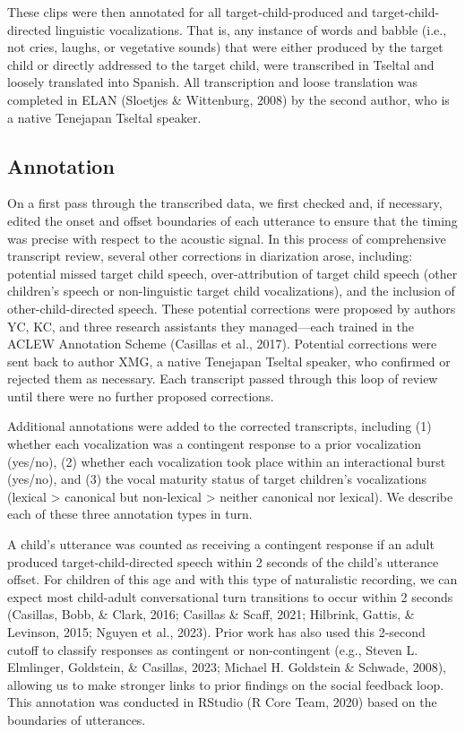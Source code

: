 \documentclass[
  man]{apa6}
\begin{document}
These clips were then annotated for all target-child-produced and target-child-directed linguistic vocalizations. That is, any instance of words and babble (i.e., not cries, laughs, or vegetative sounds) that were either produced by the target child or directly addressed to the target child, were transcribed in Tseltal and loosely translated into Spanish. All transcription and loose translation was completed in ELAN (Sloetjes \& Wittenburg, 2008) by the second author, who is a native Tenejapan Tseltal speaker.

\hypertarget{annotation}{%
\subsection{Annotation}\label{annotation}}

On a first pass through the transcribed data, we first checked and, if necessary, edited the onset and offset boundaries of each utterance to ensure that the timing was precise with respect to the acoustic signal. In this process of comprehensive transcript review, several other corrections in diarization arose, including: potential missed target child speech, over-attribution of target child speech (other children's speech or non-linguistic target child vocalizations), and the inclusion of other-child-directed speech. These potential corrections were proposed by authors YC, KC, and three research assistants they managed---each trained in the ACLEW Annotation Scheme (Casillas et al., 2017). Potential corrections were sent back to author XMG, a native Tenejapan Tseltal speaker, who confirmed or rejected them as necessary. Each transcript passed through this loop of review until there were no further proposed corrections.

Additional annotations were added to the corrected transcripts, including (1) whether each vocalization was a contingent response to a prior vocalization (yes/no), (2) whether each vocalization took place within an interactional burst (yes/no), and (3) the vocal maturity status of target children's vocalizations (lexical \textgreater{} canonical but non-lexical \textgreater{} neither canonical nor lexical). We describe each of these three annotation types in turn.

A child's utterance was counted as receiving a contingent response if an adult produced target-child-directed speech within 2 seconds of the child's utterance offset. For children of this age and with this type of naturalistic recording, we can expect most child-adult conversational turn transitions to occur within 2 seconds (Casillas, Bobb, \& Clark, 2016; Casillas \& Scaff, 2021; Hilbrink, Gattis, \& Levinson, 2015; Nguyen et al., 2023). Prior work has also used this 2-second cutoff to classify responses as contingent or non-contingent (e.g., Steven L. Elmlinger, Goldstein, \& Casillas, 2023; Michael H. Goldstein \& Schwade, 2008), allowing us to make stronger links to prior findings on the social feedback loop. This annotation was conducted in RStudio (R Core Team, 2020) based on the boundaries of utterances.
\end{document}
